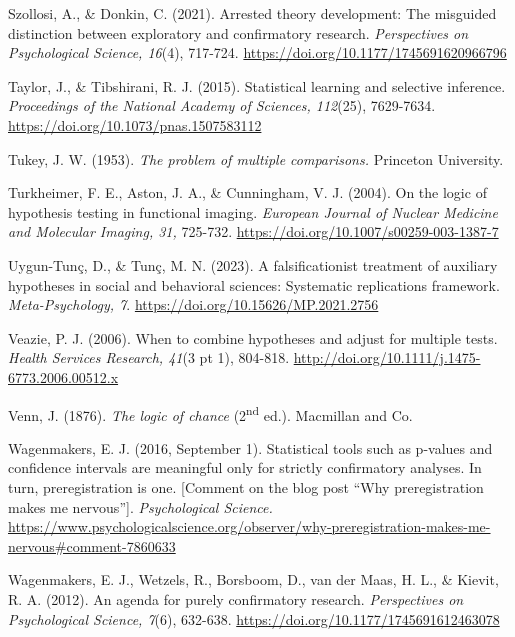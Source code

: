 \documentclass[authordate, meta, issue]{jote-new-article}
\begin{document}
Szollosi, A., \& Donkin, C. (2021). Arrested theory development: The misguided distinction between exploratory and confirmatory research. \emph{Perspectives on Psychological Science, 16}(4), 717-724. \url{https://doi.org/10.1177/1745691620966796}



Taylor, J., \& Tibshirani, R. J. (2015). Statistical learning and selective inference. \emph{Proceedings of the National Academy of Sciences, 112}(25), 7629-7634. \url{https://doi.org/10.1073/pnas.1507583112}



Tukey, J. W. (1953). \emph{The problem of multiple comparisons.} Princeton University.



Turkheimer, F. E., Aston, J. A., \& Cunningham, V. J. (2004). On the logic of hypothesis testing in functional imaging. \emph{European Journal of Nuclear Medicine and Molecular Imaging, 31, }725-732. \url{https://doi.org/10.1007/s00259-003-1387-7}



Uygun-Tunç, D., \& Tunç, M. N. (2023). A falsificationist treatment of auxiliary hypotheses in social and behavioral sciences: Systematic replications framework. \emph{Meta-Psychology, 7}. \url{https://doi.org/10.15626/MP.2021.2756}



Veazie, P. J. (2006). When to combine hypotheses and adjust for multiple tests. \emph{Health Services Research, 41}(3 pt 1), 804-818. \url{http://doi.org/10.1111/j.1475-6773.2006.00512.x}



Venn, J. (1876). \emph{The logic of chance} (2\textsuperscript{nd} ed.). Macmillan and Co.



Wagenmakers, E. J. (2016, September 1). Statistical tools such as p-values and confidence intervals are meaningful only for strictly confirmatory analyses. In turn, preregistration is one. [Comment on the blog post “Why preregistration makes me nervous”]. \emph{Psychological Science.} \url{https://www.psychologicalscience.org/observer/why-preregistration-makes-me-nervous\#comment-7860633}



Wagenmakers, E. J., Wetzels, R., Borsboom, D., van der Maas, H. L., \& Kievit, R. A. (2012). An agenda for purely confirmatory research. \emph{Perspectives on Psychological Science, 7}(6), 632-638. \url{https://doi.org/10.1177/1745691612463078}
\end{document}
